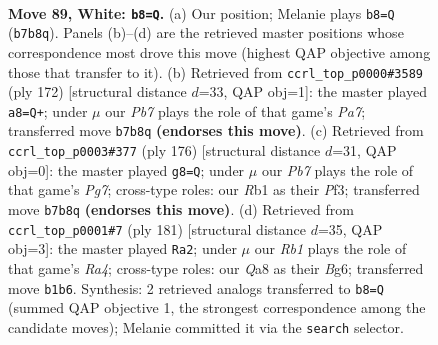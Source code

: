 \documentclass[11pt]{article}
\begin{document}
\clearpage

\begin{figure}[p]\centering
\begin{subfigure}{0.46\textwidth}\centering
\resizebox{\linewidth}{!}{%
\newchessgame
\chessboard[
  setfen={Q7/1P4k1/7n/8/8/8/7r/KR6 w - - 1 89},
  showmover=false,
  pgfstyle=straightmove, color=movearrow, markmove={b7-b8}
]}
\caption{}
\end{subfigure}\hfill
\begin{subfigure}{0.46\textwidth}\centering
\resizebox{\linewidth}{!}{%
\newchessgame
\chessboard[
  setfen={1Q6/P7/2k5/8/8/8/2K3R1/8 w - - 1 87},
  showmover=false,
  pgfstyle=straightmove, color=movearrow, markmove={a7-a8}
]}
\caption{}
\end{subfigure}
\\[4pt]
\begin{subfigure}{0.46\textwidth}\centering
\resizebox{\linewidth}{!}{%
\newchessgame
\chessboard[
  setfen={R6Q/6P1/8/8/8/5P2/2k3K1/8 w - - 1 89},
  showmover=false,
  pgfstyle=straightmove, color=movearrow, markmove={g7-g8}
]}
\caption{}
\end{subfigure}\hfill
\begin{subfigure}{0.46\textwidth}\centering
\resizebox{\linewidth}{!}{%
\newchessgame
\chessboard[
  setfen={8/5p2/6b1/rk6/8/4N3/8/2R3K1 b - - 5 91},
  showmover=false,
  pgfstyle=straightmove, color=movearrow, markmove={a5-a2}
]}
\caption{}
\end{subfigure}
\caption{\textbf{Move 89, White: \texttt{b8=Q}.} (a) Our position; Melanie plays \texttt{b8=Q} (\texttt{b7b8q}). Panels (b)--(d) are the retrieved master positions whose correspondence most drove this move (highest QAP objective among those that transfer to it). (b) Retrieved from \texttt{ccrl\_top\_p0000\#3589} (ply 172) [structural distance $d$=33, QAP obj=1]: the master played \texttt{a8=Q+}; under $\mu$ our \emph{Pb7} plays the role of that game's \emph{Pa7}; transferred move \texttt{b7b8q} \textbf{(endorses this move)}. (c) Retrieved from \texttt{ccrl\_top\_p0003\#377} (ply 176) [structural distance $d$=31, QAP obj=0]: the master played \texttt{g8=Q}; under $\mu$ our \emph{Pb7} plays the role of that game's \emph{Pg7}; cross-type roles: our \emph{R}b1 as their \emph{P}f3; transferred move \texttt{b7b8q} \textbf{(endorses this move)}. (d) Retrieved from \texttt{ccrl\_top\_p0001\#7} (ply 181) [structural distance $d$=35, QAP obj=3]: the master played \texttt{Ra2}; under $\mu$ our \emph{Rb1} plays the role of that game's \emph{Ra4}; cross-type roles: our \emph{Q}a8 as their \emph{B}g6; transferred move \texttt{b1b6}. Synthesis: 2 retrieved analogs transferred to \texttt{b8=Q} (summed QAP objective 1, the strongest correspondence among the candidate moves); Melanie committed it via the \texttt{search} selector.}
\label{fig:thought-m176}
\end{figure}
\end{document}
